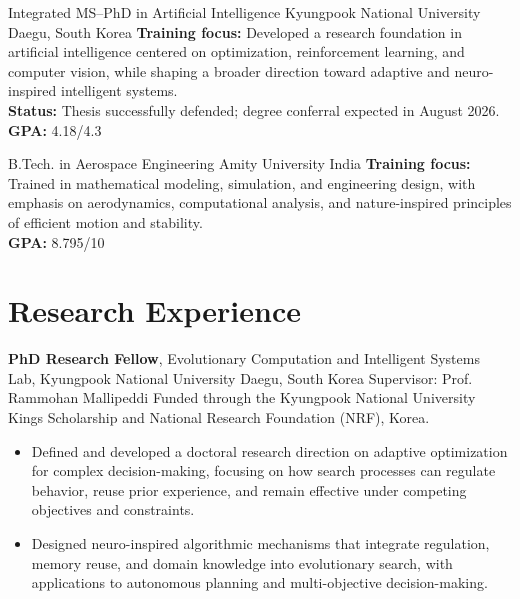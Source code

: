 \documentclass[11pt,a4paper,sans]{moderncv} %
\begin{document}
{Integrated MS--PhD in Artificial Intelligence}
{Kyungpook National University}
{Daegu, South Korea}
{}
{\textbf{Training focus:} Developed a research foundation in artificial intelligence centered on optimization, reinforcement learning, and computer vision, while shaping a broader direction toward adaptive and neuro-inspired intelligent systems.\\
\textbf{Status:} Thesis successfully defended; degree conferral expected in August 2026.\\
\textbf{GPA:} 4.18/4.3\\}

{B.Tech. in Aerospace Engineering}
{Amity University}
{India}
{}
{\textbf{Training focus:} Trained in mathematical modeling, simulation, and engineering design, with emphasis on aerodynamics, computational analysis, and nature-inspired principles of efficient motion and stability.\\
\textbf{GPA:} 8.795/10}


\section{Research Experience}

{\textbf{PhD Research Fellow}, Evolutionary Computation and Intelligent Systems Lab, Kyungpook National University}
{Daegu, South Korea}
{Supervisor: Prof. Rammohan Mallipeddi}
{}
{Funded through the Kyungpook National University Kings Scholarship and National Research Foundation (NRF), Korea.}
\begin{itemize}
   \vspace{-0.3cm}\item Defined and developed a doctoral research direction on adaptive optimization for complex decision-making, focusing on how search processes can regulate behavior, reuse prior experience, and remain effective under competing objectives and constraints.
   \vspace{-0.2cm}\item Designed neuro-inspired algorithmic mechanisms that integrate regulation, memory reuse, and domain knowledge into evolutionary search, with applications to autonomous planning and multi-objective decision-making.
\end{itemize}
\end{document}
